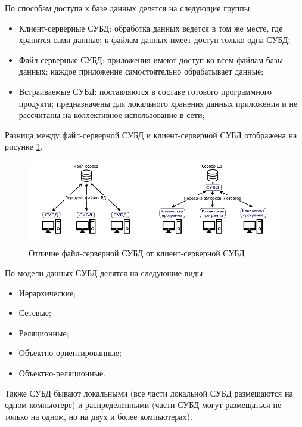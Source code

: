 По способам доступа к базе данных делятся на следующие группы:
\begin{itemize}
    \item Клиент-серверные СУБД: обработка данных ведется в том же месте, где
        хранятся сами данные; к файлам данных имеет доступ только одна СУБД;
    \item Файл-серверные СУБД: приложения имеют доступ ко всем файлам базы
        данных; каждое приложение самостоятельно обрабатывает данные;
    \item Встраиваемые СУБД: поставляются в составе готового программного
        продукта; предназначены для локального хранения данных приложения и не
        рассчитаны на коллективное использование в сети;
\end{itemize}

Разница между файл-серверной СУБД и клиент-серверной СУБД отображена на рисунке
\ref{fig:file-client-serv-dif}.
\begin{figure}[H]
    \centering
    \includegraphics[scale=0.55]{inc/img/file-server-subd.png}
    \caption{Отличие файл-серверной СУБД от клиент-серверной СУБД}
    \label{fig:file-client-serv-dif}
\end{figure}

По модели данных СУБД делятся на следующие виды:
\begin{itemize}
    \item Иерархические;
    \item Сетевые;
    \item Реляционные;
    \item Объектно-ориентированные;
    \item Объектно-реляционные.
\end{itemize}

Также СУБД бывают локальными (все части локальной СУБД размещаются на одном
компьютере) и распределенными (части СУБД могут размещаться не только на одном,
но на двух и более компьютерах).

